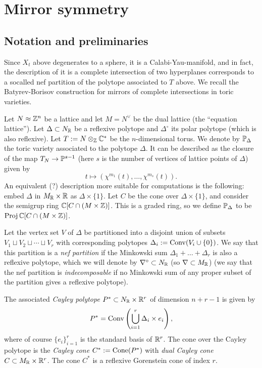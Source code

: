 \documentclass[11pt, english]{article}
\begin{document}
\section{Mirror symmetry}

\subsection{Notation and preliminaries}

Since $X_t$ above degenerates to a sphere, it is a Calabi-Yau-manifold, and in fact, the description of it is a complete intersection of two hyperplanes corresponds to a socalled nef partition of the polytope associated to $T$ above. We recall the Batyrev-Borisov construction for mirrors of complete intersections in toric varieties. 

Let $N \approx \mathbb{Z}^n$ be a lattice and let $M=N^\vee$ be the dual lattice (the ``equation lattice''). Let $\Delta \subset N_{\mathbb{R}}$ be a reflexive polytope and $\Delta^\circ$ its polar polytope (which is also reflexive). Let $T:=N \otimes_{\mathbb{Z}} \mathbb{C}^\ast$ be the $n$-dimensional torus. We denote by $\mathbb{P}_\Delta$ the toric variety associated to the polytope $\Delta$.   It can be described as the closure of the map $T_N \to \mathbb{P}^{s-1}$ (here $s$ is the number of vertices of lattice points of $\Delta$) given by
\[
t \mapsto \left( \chi^{m_1}(t), \ldots, \chi^{m_s}(t) \right).
\]
An equivalent (?) description more suitable for computations is the following: embed $\Delta$ in $M_{\mathbb{R}} \times \mathbb{R}$ as $\Delta \times \{1\}$. Let $C$ be the cone over $\Delta \times \{1\}$, and consider the semigrup ring $\mathbb{C}[C \cap (M \times \mathbb{Z})]$. This is a graded ring, so we define $\mathbb{P}_\Delta$ to be $\operatorname{Proj} \mathbb{C}[C \cap (M \times \mathbb{Z})]$.

Let the vertex set $V$ of $\Delta$ be partitioned into a disjoint union of subsets $V_1 \sqcup V_2 \sqcup \cdots \sqcup V_r$ with corresponding polytopes $\Delta_i := \operatorname{Conv}( V_i \cup \{ 0\})$. We say that this partition is a \emph{nef partition} if the Minkowski sum $ \Delta_1 +\ldots+\Delta_r$ is also a reflexive polytope, which we will denote by $\nabla^\circ \subset N_{\mathbb{R}}$ (so $\nabla \subset M_{\mathbb{R}}$) (we say that the nef partition is \emph{indecomposable} if no Minkowski sum of any proper subset of the partition gives a reflexive polytope).

The associated \emph{Cayley polytope} $P^\ast \subset N_{\mathbb{R}} \times \mathbb{R}^r$ of dimension $n+r-1$ is given by 
\[
P^\ast = \operatorname{Conv} \left( \bigcup_{i=1}^r \Delta_i \times e_i \right),
\]
where of course $\{e_i\}_{i=1}^r$ is the standard basis of $\mathbb{R}^r$. The cone over the Cayley polytope is the \emph{Cayley cone} $C^\ast := \operatorname{Cone}(P^\ast)$ with \emph{dual Cayley cone} $C \subset M_{\mathbb{R}} \times \mathbb{R}^r$. The cone $C^\ast$ is a reflexive Gorenstein cone of index $r$.
\end{document}
